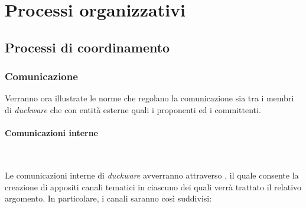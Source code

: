 \clearpage
\section{Processi organizzativi}
\label{sec:proc_org}
\subsection{Processi di coordinamento}
\label{sec:processi_coordinamento}
\subsubsection{Comunicazione}
Verranno ora illustrate le norme che regolano la comunicazione sia tra i membri di \emph{duckware} che con entità esterne quali i proponenti ed i committenti.

\paragraph{Comunicazioni interne}\mbox{}\\[0.4cm]
Le comunicazioni interne di \emph{duckware} avverranno attraverso , il quale consente la creazione di appositi canali tematici in ciascuno dei quali verrà trattato il relativo argomento. In particolare, i canali saranno così suddivisi:
